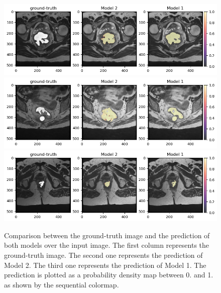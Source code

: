 \documentclass{standalone}
\begin{document}
\begin{figure}[htp]

    \centering
    \includegraphics[width=\textwidth]{../images/predcomparisonoverlap3.png}
    \includegraphics[width=\textwidth]{../images/predcomparisonoverlap4.png}
    \includegraphics[width=\textwidth]{../images/predcomparisonoverlap5.png}
    

    \caption{Comparison between the ground-truth image and the prediction of both models over the input image. 
    The first column represents the ground-truth image. 
    The second one represents the prediction of Model 2. 
    The third one represents the prediction of Model 1.
    The prediction is plotted as a probability density map between 0. and 1. as shown by the sequential colormap.}\label{predcomparisonoverlap2}

\end{figure}
\end{document}
